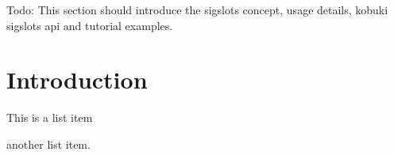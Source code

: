 \-Todo\-: \-This section should introduce the sigslots concept, usage details, kobuki sigslots api and tutorial examples.\section{\-Introduction}\label{koSigslotsGuide_sigslotsIntro}

\begin{DoxyItemize}
\item \-This is a list item
\item another list item. 
\end{DoxyItemize}